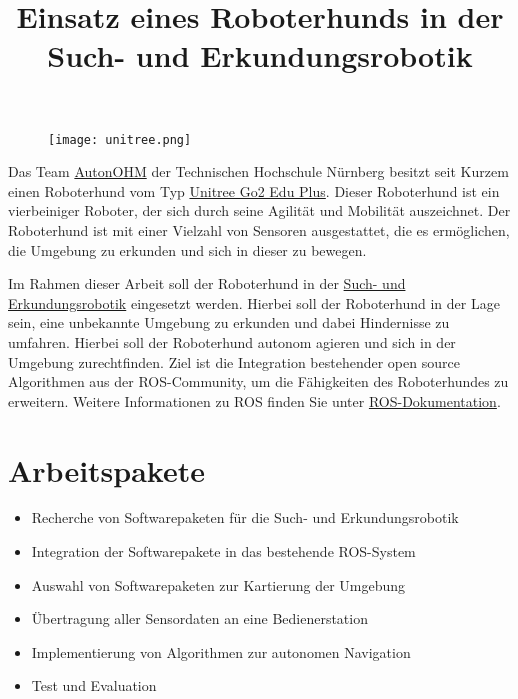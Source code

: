 \documentclass[a4paper,11pt]{article}
\title{\textcolor{ohm_red}{Einsatz eines Roboterhunds in der Such- und Erkundungsrobotik}}
\date{}
\begin{document}
\maketitle
\thispagestyle{fancy}

\vspace*{-3cm}
\begin{figure}[h!]
    \centering
    \texttt{[image: unitree.png]}
\end{figure}



Das Team \href{https://www.th-nuernberg.de/fakultaeten/efi/forschung/forschungsaktive-labore/mobile-robotik/}{AutonOHM} der Technischen Hochschule Nürnberg besitzt seit Kurzem einen Roboterhund vom Typ \href{https://www.youtube.com/watch?v=6zPvT0ig1VM}{Unitree Go2 Edu Plus}. Dieser Roboterhund ist ein vierbeiniger Roboter, der sich durch seine Agilität und Mobilität auszeichnet. Der Roboterhund ist mit einer Vielzahl von Sensoren ausgestattet, die es ermöglichen, die Umgebung zu erkunden und sich in dieser zu bewegen. 

Im Rahmen dieser Arbeit soll der Roboterhund in der \href{https://searchandrescuerobots.com/}{Such- und Erkundungsrobotik} eingesetzt werden. Hierbei soll der Roboterhund in der Lage sein, eine unbekannte Umgebung zu erkunden und dabei Hindernisse zu umfahren. Hierbei soll der Roboterhund autonom agieren und sich in der Umgebung zurechtfinden. Ziel ist die Integration bestehender open source Algorithmen aus der ROS-Community, um die Fähigkeiten des Roboterhundes zu erweitern. Weitere Informationen zu ROS finden Sie unter \href{https://docs.ros.org/en/foxy/index.html}{ROS-Dokumentation}. 

\section*{Arbeitspakete}
\begin{itemize}[leftmargin=0.5cm]
    \item Recherche von Softwarepaketen für die Such- und Erkundungsrobotik
    \item Integration der Softwarepakete in das bestehende ROS-System
    \item Auswahl von Softwarepaketen zur Kartierung der Umgebung
    \item Übertragung aller Sensordaten an eine Bedienerstation
    \item Implementierung von Algorithmen zur autonomen Navigation
    \item Test und Evaluation 
\end{itemize}
\end{document}
